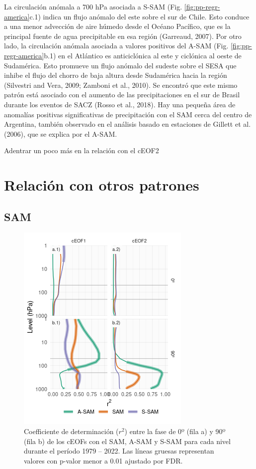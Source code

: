 \documentclass[12pt,oneside]{reedthesis}
\begin{document}
La circulación anómala a 700 hPa asociada a S-SAM (Fig. \ref{fig:pp-regr-america}c.1) indica un flujo anómalo del este sobre el sur de Chile.
Esto conduce a una menor advección de aire húmedo desde el Océano Pacífico, que es la principal fuente de agua precipitable en esa región (Garreaud, 2007).
Por otro lado, la circulación anómala asociada a valores positivos del A-SAM (Fig. \ref{fig:pp-regr-america}b.1) en el Atlántico es anticiclónica al este y ciclónica al oeste de Sudamérica.
Esto promueve un flujo anómalo del sudeste sobre el SESA que inhibe el flujo del chorro de baja altura desde Sudamérica hacia la región (Silvestri and Vera, 2009; Zamboni et al., 2010).
Se encontró que este mismo patrón está asociado con el aumento de las precipitaciones en el sur de Brasil durante los eventos de SACZ (Rosso et al., 2018).
Hay una pequeña área de anomalías positivas significativas de precipitación con el SAM cerca del centro de Argentina, también observado en el análisis basado en estaciones de Gillett et al. (2006), que se explica por el A-SAM.

Adentrar un poco más en la relación con el cEOF2

\hypertarget{relaciuxf3n-con-otros-patrones}{%
\section{Relación con otros patrones}\label{relaciuxf3n-con-otros-patrones}}

\hypertarget{sam}{%
\subsection{SAM}\label{sam}}




\begin{figure}
\includegraphics{figures/40-sam-ceof/sam-eof-vertical-1} \caption{Coefficiente de determinación (\(r^2\)) entre la fase de 0º (fila a) y 90º (fila b) de los cEOFs con el SAM, A-SAM y S-SAM para cada nivel durante el período 1979 -- 2022.
Las líneas gruesas representan valores con p-valor menor a 0.01 ajustado por FDR.}\label{fig:sam-eof-vertical}
\end{figure}
\end{document}
